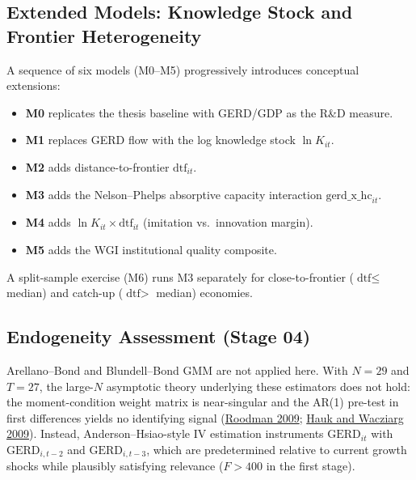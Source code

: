 \documentclass[
  11pt,
]{article}
\providecommand{\tightlist}{%
  \setlength{\itemsep}{0pt}\setlength{\parskip}{0pt}}
\begin{document}
\hypertarget{extended-models-knowledge-stock-and-frontier-heterogeneity}{%
\subsection{Extended Models: Knowledge Stock and Frontier Heterogeneity}\label{extended-models-knowledge-stock-and-frontier-heterogeneity}}

A sequence of six models (M0--M5) progressively introduces conceptual extensions:

\begin{itemize}
\tightlist
\item
  \textbf{M0} replicates the thesis baseline with GERD/GDP as the R\&D measure.
\item
  \textbf{M1} replaces GERD flow with the log knowledge stock \(\ln K_{it}\).
\item
  \textbf{M2} adds distance-to-frontier \(\text{dtf}_{it}\).
\item
  \textbf{M3} adds the Nelson--Phelps absorptive capacity interaction \(\text{gerd\_x\_hc}_{it}\).
\item
  \textbf{M4} adds \(\ln K_{it} \times \text{dtf}_{it}\) (imitation vs.~innovation margin).
\item
  \textbf{M5} adds the WGI institutional quality composite.
\end{itemize}

A split-sample exercise (M6) runs M3 separately for close-to-frontier (\(\text{dtf} \leq\) median) and catch-up (\(\text{dtf} >\) median) economies.

\hypertarget{endogeneity-assessment-stage-04}{%
\subsection{Endogeneity Assessment (Stage 04)}\label{endogeneity-assessment-stage-04}}

Arellano--Bond and Blundell--Bond GMM are not applied here. With \(N = 29\) and \(T = 27\), the large-\(N\) asymptotic theory underlying these estimators does not hold: the moment-condition weight matrix is near-singular and the AR(1) pre-test in first differences yields no identifying signal (\protect\hyperlink{ref-roodman2009}{Roodman 2009}; \protect\hyperlink{ref-hauk2009}{Hauk and Wacziarg 2009}). Instead, Anderson--Hsiao-style IV estimation instruments \(\text{GERD}_{it}\) with \(\text{GERD}_{i,t-2}\) and \(\text{GERD}_{i,t-3}\), which are predetermined relative to current growth shocks while plausibly satisfying relevance (\(F > 400\) in the first stage).
\end{document}
